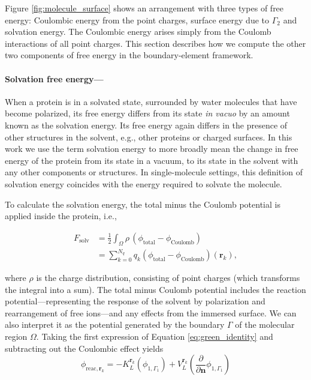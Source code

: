 
Figure \ref{fig:molecule_surface} shows an arrangement with three types of free energy: Coulombic energy from the point charges, surface energy due to $\Gamma_2$ and solvation energy. The Coulombic energy arises simply from the Coulomb interactions of all point charges. This section describes how we compute the other two components of free energy in the boundary-element framework.

\medskip

\paragraph*{Solvation free energy---}

When a protein is in a solvated state, surrounded by water molecules that have become polarized, its free energy differs from its state \emph{in vacuo} by an amount known as the solvation energy. Its free energy again differs in the presence of other structures in the solvent, e.g., other proteins or charged surfaces. In this work we use the term solvation energy to more broadly mean the change in free energy of the protein from its state in a vacuum, to its state in the solvent with any other components or structures. In single-molecule settings, this definition of solvation energy coincides with the energy required to solvate the molecule. 

To calculate the solvation energy, the total minus the Coulomb potential is applied inside the protein, i.e.,

\begin{align} \label{eq:solv_energy}
F_{\text{solv}} &= \frac{1}{2} \int_{\Omega} \rho \,(\phi_{\text{total}} - \phi_{\text{Coulomb}}) \\
&= \sum_{k=0}^{N_q} q_k (\phi_{\text{total}} - \phi_{\text{Coulomb}})(\mathbf{r}_k),
\end{align}

\noindent where $\rho$ is the charge distribution, consisting of point charges (which transforms the integral into a sum). 
The total minus Coulomb potential includes the reaction potential---representing the response of the solvent by polarization and rearrangement of free ions---and any effects from the immersed surface.
We can also interpret it as the potential generated by the boundary $\Gamma$ of the molecular region $\Omega$. Taking the first expression of Equation \eqref{eq:green_identity} and subtracting out the Coulombic effect yields
%
\begin{equation} \label{eq:phi_reac_bem}
\phi_{\text{reac},\mathbf{r}_k} = -K_{L}^{\mathbf{r}_k}(\phi_{1,\Gamma_1}) + V_{L}^{\mathbf{r}_k} \left(\frac{\partial}{\partial \mathbf{n}}\phi_{1,\Gamma_1} \right) 
\end{equation}

